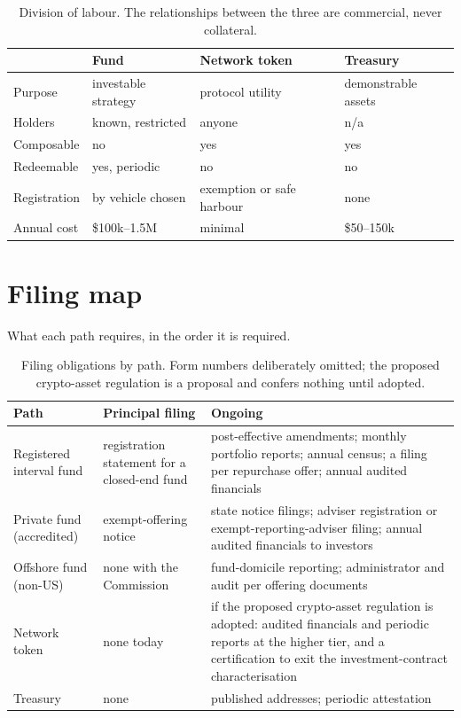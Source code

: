 \documentclass[11pt,a4paper]{article}
\begin{document}
\begin{table}[h]
\centering
\begin{tabularx}{\textwidth}{lXXX}
\toprule
 & Fund & Network token & Treasury \\
\midrule
Purpose & investable strategy & protocol utility & demonstrable assets \\
Holders & known, restricted & anyone & n/a \\
Composable & no & yes & yes \\
Redeemable & yes, periodic & no & no \\
Registration & by vehicle chosen & exemption or safe harbour & none \\
Annual cost & \$100k--1.5M & minimal & \$50--150k \\
\bottomrule
\end{tabularx}
\caption{Division of labour. The relationships between the three are commercial,
never collateral.}
\end{table}

\section{Filing map}

What each path requires, in the order it is required.

\begin{table}[h]
\centering
\begin{tabularx}{\textwidth}{llX}
\toprule
Path & Principal filing & Ongoing \\
\midrule
Registered interval fund & registration statement for a closed-end fund
 & post-effective amendments; monthly portfolio reports; annual census; a filing
   per repurchase offer; annual audited financials \\
Private fund (accredited) & exempt-offering notice
 & state notice filings; adviser registration or exempt-reporting-adviser filing;
   annual audited financials to investors \\
Offshore fund (non-US) & none with the Commission
 & fund-domicile reporting; administrator and audit per offering documents \\
Network token & none today
 & if the proposed crypto-asset regulation is adopted: audited financials and
   periodic reports at the higher tier, and a certification to exit the
   investment-contract characterisation \\
Treasury & none & published addresses; periodic attestation \\
\bottomrule
\end{tabularx}
\caption{Filing obligations by path. Form numbers deliberately omitted; the
proposed crypto-asset regulation is a proposal and confers nothing until adopted.}
\end{table}
\end{document}
